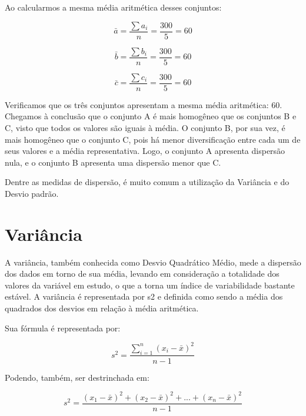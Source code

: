 Ao calcularmos a mesma média aritmética desses conjuntos:

\begin{equation}
    \label{eq:media_aritmetica}
    \bar{a} = \frac{\sum a_i}{n} = \frac{300}{5} = 60
\end{equation}

\begin{equation}
    \qquad
    \bar{b} = \frac{\sum b_i}{n} = \frac{300}{5} = 60
    \qquad
\end{equation}

\begin{equation}
    \bar{c} = \frac{\sum c_i}{n} = \frac{300}{5} = 60
\end{equation}

Verificamos que os três conjuntos apresentam a mesma média aritmética: 60. Chegamos à conclusão que o conjunto A é mais homogêneo que os conjuntos B e C, visto que todos os valores são iguais à média. O conjunto B, por sua vez, é mais homogêneo que o conjunto C, pois há menor diversificação entre cada um de seus valores e a média representativa. Logo, o conjunto A apresenta dispersão nula, e o conjunto B apresenta uma dispersão menor que C.

Dentre as medidas de dispersão, é muito comum a utilização da Variância e do Desvio padrão.


\section{Variância}
A variância, também conhecida como Desvio Quadrático Médio, mede a dispersão dos dados em torno de sua média, levando em consideração a totalidade dos valores da variável em estudo, o que a torna um índice de variabilidade bastante estável. A variância é representada por s2 e definida como sendo a média dos quadrados dos desvios em relação à média aritmética.

Sua fórmula é representada por:

\begin{equation}
    s^2 = \frac{\sum_{i=1}^n (x_i - \bar{x})^2}{n - 1}
    \label{eq:variancia_1}
\end{equation}

Podendo, também, ser destrinchada em:

\begin{equation}
    s^2 = \frac{(x_1 - \bar{x})^2 + (x_2 - \bar{x})^2 + ... + (x_n - \bar{x})^2}{n - 1}
    \label{eq:variancia_expandida}
\end{equation}

